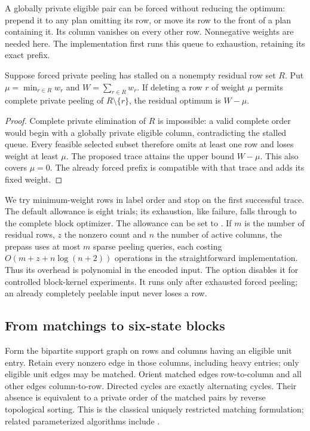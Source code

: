 A globally private eligible pair can be forced without reducing the
optimum: prepend it to any plan omitting its row, or move its row to the
front of a plan containing it.  Its column vanishes on every other row.
Nonnegative weights are needed here.  The implementation first runs this
queue to exhaustion, retaining its exact prefix.

\begin{proposition}
Suppose forced private peeling has stalled on a nonempty residual row
set $R$.  Put $\mu=\min_{r\in R}w_r$ and $W=\sum_{r\in R}w_r$.
If deleting a row $r$ of weight $\mu$ permits complete private peeling
of $R\setminus\{r\}$, the residual optimum is $W-\mu$.
\end{proposition}
\begin{proof}
Complete private elimination of $R$ is impossible: a valid complete
order would begin with a globally private eligible column, contradicting
the stalled queue.  Every feasible selected subset therefore omits at
least one row and loses weight at least $\mu$.  The proposed trace attains
the upper bound $W-\mu$.  This also covers $\mu=0$.  The already forced
prefix is compatible with that trace and adds its fixed weight.
\end{proof}

We try minimum-weight rows in label order and stop on the first successful
trace.  The default allowance is eight trials; its exhaustion, like failure,
falls through to the complete block optimizer.  The allowance can be set to
.  If $m$
is the number of residual rows, $z$ the nonzero count and $n$ the number
of active columns, the prepass uses at most $m$ sparse peeling queries,
each costing $O(m+z+n\log(n+2))$ operations in the straightforward
implementation.  Thus its overhead is polynomial in the encoded input.
The option  disables it for controlled
block-kernel experiments.  It runs only after exhausted forced peeling;
an already completely peelable input never loses a row.

\subsection{From matchings to six-state blocks}

Form the bipartite support graph on rows and columns having an eligible
unit entry.  Retain every nonzero edge in those columns, including heavy
entries; only eligible unit edges may be matched.  Orient matched edges
row-to-column and all other edges column-to-row.  Directed cycles are
exactly alternating cycles.  Their absence is equivalent to a private
order of the matched pairs by reverse topological sorting.  This is the
classical uniquely restricted matching formulation; related
parameterized algorithms include \cite{cycle-urm}.


